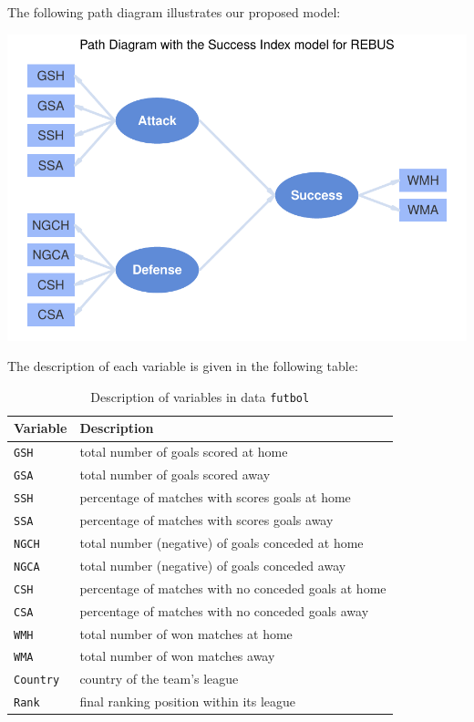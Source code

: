 \documentclass[12pt]{book}\usepackage{graphicx, color}
\newenvironment{knitrout}{}{} %
\newcommand{\code}[1]{\texttt{#1}}
\begin{document}
The following path diagram illustrates our proposed model:



\begin{knitrout}
\color{fgcolor}

{\centering \includegraphics[width=.9\linewidth,height=.5\linewidth]{figure/futbol_model_diagram} 

}



\end{knitrout}


The description of each variable is given in the following table:

\begin{table}[h]
 \caption{Description of variables in data \code{futbol}} 
 \centering
 \begin{tabular}{l l}
  \hline
  Variable & Description \\
  \hline
  \code{GSH} & total number of goals scored at home  \\
  \code{GSA} & total number of goals scored away \\
  \code{SSH} & percentage of matches with scores goals at home \\
  \code{SSA} & percentage of matches with scores goals away \\
  \code{NGCH} & total number (negative) of goals conceded at home \\
  \code{NGCA} & total number (negative) of goals conceded away \\
  \code{CSH} & percentage of matches with no conceded goals at home \\
  \code{CSA} & percentage of matches with no conceded goals away \\
  \code{WMH} & total number of won matches at home \\
  \code{WMA} & total number of won matches away \\
  \code{Country} & country of the team's league \\
  \code{Rank} & final ranking position within its league \\
  \hline
 \end{tabular}
 \label{tab:futbol}
\end{table}
\end{document}
